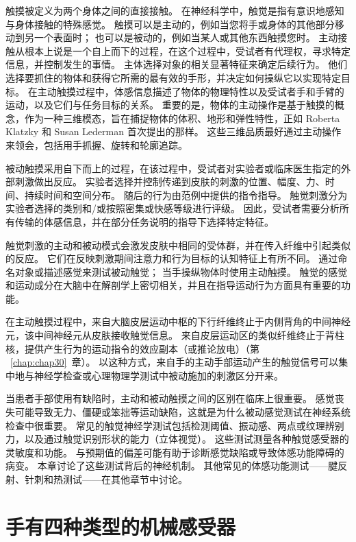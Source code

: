 触摸被定义为两个身体之间的直接接触。
在神经科学中，触觉是指有意识地感知与身体接触的特殊感觉。
触摸可以是主动的，例如当您将手或身体的其他部分移动到另一个表面时；
也可以是被动的，例如当某人或其他东西触摸您时。
主动接触从根本上说是一个自上而下的过程，在这个过程中，受试者有代理权，寻求特定信息，并控制发生的事情。
主体选择对象的相关显著特征来确定后续行为。
他们选择要抓住的物体和获得它所需的最有效的手形，并决定如何操纵它以实现特定目标。
在主动触摸过程中，体感信息描述了物体的物理特性以及受试者手和手臂的运动，以及它们与任务目标的关系。
重要的是，物体的主动操作是基于触摸的概念，作为一种三维模态，旨在捕捉物体的体积、地形和弹性特性，正如 Roberta Klatzky 和 Susan Lederman 首次提出的那样。
这些三维品质最好通过主动操作来领会，包括用手抓握、旋转和轮廓追踪。


被动触摸采用自下而上的过程，在该过程中，受试者对实验者或临床医生指定的外部刺激做出反应。
实验者选择并控制传递到皮肤的刺激的位置、幅度、力、时间、持续时间和空间分布。
随后的行为由范例中提供的指令指导。
触觉刺激分为实验者选择的类别和/或按照密集或快感等级进行评级。
因此，受试者需要分析所有传输的体感信息，并在部分任务说明的指导下选择特定特征。


触觉刺激的主动和被动模式会激发皮肤中相同的受体群，并在传入纤维中引起类似的反应。
它们在反映刺激期间注意力和行为目标的认知特征上有所不同。
通过命名对象或描述感觉来测试被动触觉；
当手操纵物体时使用主动触摸。
触觉的感觉和运动成分在大脑中在解剖学上密切相关，并且在指导运动行为方面具有重要的功能。


在主动触摸过程中，来自大脑皮层运动中枢的下行纤维终止于内侧背角的中间神经元，该中间神经元从皮肤接收触觉信息。
来自皮层运动区的类似纤维终止于背柱核，提供产生行为的运动指令的效应副本（或推论放电）（第 ~\ref{chap:chap30}~章）。
以这种方式，来自手的主动手部运动产生的触觉信号可以集中地与神经学检查或心理物理学测试中被动施加的刺激区分开来。


当患者手部使用有缺陷时，主动和被动触摸之间的区别在临床上很重要。
感觉丧失可能导致无力、僵硬或笨拙等运动缺陷，这就是为什么被动感觉测试在神经系统检查中很重要。
常见的触觉神经学测试包括检测阈值、振动感、两点或纹理辨别力，以及通过触觉识别形状的能力（立体视觉）。 
这些测试测量各种触觉感受器的灵敏度和功能。
与预期值的偏差可能有助于诊断感觉缺陷或导致体感功能障碍的病变。
本章讨论了这些测试背后的神经机制。
其他常见的体感功能测试——腱反射、针刺和热测试——在其他章节中讨论。



\section{手有四种类型的机械感受器}

